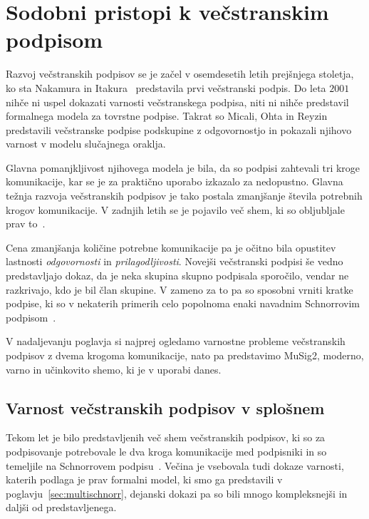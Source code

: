 \section{Sodobni pristopi k večstranskim podpisom}
\label{sec:sodobno}
Razvoj večstranskih podpisov se je začel v osemdesetih letih prejšnjega stoletja, ko sta Nakamura
in Itakura~\cite{itakura1983multi} predstavila prvi večstranski podpis. Do leta $2001$ nihče ni
uspel dokazati varnosti večstranskega podpisa, niti ni nihče predstavil formalnega modela za
tovrstne podpise. Takrat so Micali, Ohta in Reyzin~\cite{micali2001asm} predstavili večstranske
podpise podskupine z odgovornostjo in pokazali njihovo varnost v modelu slučajnega oraklja.

Glavna pomanjkljivost njihovega modela je bila, da so podpisi zahtevali tri kroge komunikacije, kar
se je za praktično uporabo izkazalo za nedopustno. Glavna težnja razvoja večstranskih podpisov je
tako postala zmanjšanje števila potrebnih krogov komunikacije. V zadnjih letih se je pojavilo več
shem, ki so obljubljale prav to~\cite{drijvers2019security, jonas2020musig2}.

Cena zmanjšanja količine potrebne komunikacije pa je očitno bila opustitev lastnosti \textit{odgovornosti}
in \textit{prilagodljivosti}. Novejši večstranski podpisi še vedno predstavljajo dokaz, da je neka
skupina skupno podpisala sporočilo, vendar ne razkrivajo, kdo je bil član skupine. V zameno za to
pa so sposobni vrniti kratke podpise, ki so v nekaterih primerih celo popolnoma enaki navadnim
Schnorrovim podpisom~\cite{jonas2020musig2}.

V nadaljevanju poglavja si najprej ogledamo varnostne probleme večstranskih podpisov z dvema
krogoma komunikacije, nato pa predstavimo MuSig2, moderno, varno in učinkovito shemo, ki je v
uporabi danes.

\subsection{Varnost večstranskih podpisov v splošnem}
\label{sec:varnost}
Tekom let je bilo predstavljenih več shem večstranskih podpisov, ki so za podpisovanje potrebovale
le dva kroga komunikacije med podpisniki in so temeljile na Schnorrovem podpisu~\cite{bagherzandi2008bcj,
ma2010mwld, syta2016cosi, maxwell2019musig}. Večina je vsebovala tudi dokaze varnosti, katerih podlaga
je prav formalni model, ki smo ga predstavili v poglavju~\ref{sec:multischnorr}, dejanski dokazi pa
so bili mnogo kompleksnejši in daljši od predstavljenega.

